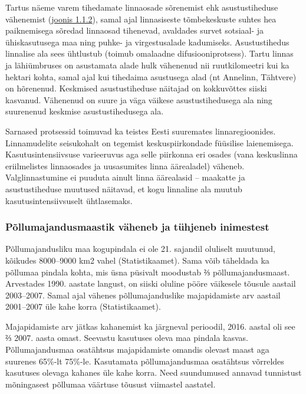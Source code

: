 \documentclass[estonian,]{article}
\begin{document}
Tartus näeme varem tihedamate linnaosade sõrenemist ehk asustustiheduse vähenemist (\protect\hyperlink{figure112}{joonis 1.1.2}), samal ajal linnasiseste tõmbekeskuste suhtes hea paiknemisega sõredad linnaosad tihenevad, avaldades survet sotsiaal- ja ühiskasutusega maa ning puhke- ja virgestusalade kadumiseks. Asustustihedus linnalise ala sees ühtlustub (toimub omalaadne difusiooniprotsess). Tartu linnas ja lähiümbruses on asustamata alade hulk vähenenud nii ruutkilomeetri kui ka hektari kohta, samal ajal kui tihedaima asustusega alad (nt Annelinn, Tähtvere) on hõrenenud. Keskmised asustustiheduse näitajad on kokkuvõttes siiski kasvanud. Vähenenud on suure ja väga väikese asustustihedusega ala ning suurenenud keskmise asustustihedusega ala.

Sarnased protsessid toimuvad ka teistes Eesti suuremates linnaregioonides. Linnamudelite seisukohalt on tegemist keskuspiirkondade füüsilise laienemisega. Kasutusintensiivsuse varieeruvus aga selle piirkonna eri osades (vana keskuslinna eriilmelistes linnaosades ja uusasumites linna äärealadel) väheneb. Valglinnastumine ei puuduta ainult linna äärealasid -- maakatte ja asustustiheduse muutused näitavad, et kogu linnaline ala muutub kasutusintensiivsuselt ühtlasemaks.

\hypertarget{puxf5llumajandusmaastik-vuxe4heneb-ja-tuxfchjeneb-inimestest}{%
\subsubsection*{Põllumajandusmaastik väheneb ja tühjeneb inimestest}\label{puxf5llumajandusmaastik-vuxe4heneb-ja-tuxfchjeneb-inimestest}}

Põllumajandusliku maa kogupindala ei ole 21. sajandil oluliselt muutunud, kõikudes 8000--9000 km2 vahel (Statistikaamet). Sama võib täheldada ka põllumaa pindala kohta, mis üsna püsivalt moodustab ⅔ põllumajandusmaast. Arvestades 1990. aastate langust, on siiski oluline pööre väikesele tõusule aastail 2003--2007. Samal ajal vähenes põllumajanduslike majapidamiste arv aastail 2001--2007 üle kahe korra (Statistikaamet).

Majapidamiste arv jätkas kahanemist ka järgneval perioodil, 2016. aastal oli see ⅔ 2007. aasta omast. Seevastu kasutuses oleva maa pindala kasvas. Põllumajandusmaa osatähtsus majapidamiste omandis olevast maast aga suurenes 65\%-lt 75\%-le. Kasutamata põllumajandusmaa osatähtsus võrreldes kasutuses olevaga kahanes üle kahe korra. Need suundumused annavad tunnistust mõningasest põllumaa väärtuse tõusust viimastel aastatel.
\end{document}
